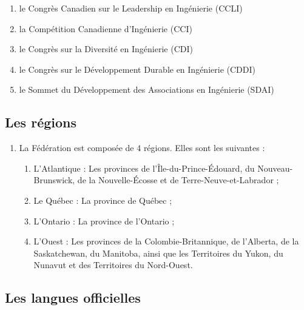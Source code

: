 \begin{enumerate}
\begin{enumerate}
    \begin{enumerate}
     \item
      le Congrès Canadien sur le Leadership en Ingénierie (CCLI)
     \item
      la Compétition Canadienne d'Ingénierie (CCI)
     \item
      le Congrès sur la Diversité en Ingénierie (CDI)
     \item
      le Congrès sur le Développement Durable en Ingénierie (CDDI)
     \item
      le Sommet du Développement des Associations en Ingénierie (SDAI)
    \end{enumerate}
  \end{enumerate}
\end{enumerate}

\subsection{Les régions}
\label{les-regions}

\begin{enumerate}
 \item
  La Fédération est composée de 4 régions. Elles sont les suivantes :

  \begin{enumerate}
   \item
    L'Atlantique : Les provinces de l'Île-du-Prince-Édouard, du Nouveau-Brunswick, de la Nouvelle-Écosse et de Terre-Neuve-et-Labrador ;
   \item
    Le Québec : La province de Québec ;
   \item
    L'Ontario : La province de l'Ontario ;
   \item
    L'Ouest : Les provinces de la Colombie-Britannique, de l'Alberta, de la Saskatchewan, du Manitoba, ainsi que les Territoires du Yukon, du Nunavut et des Territoires du Nord-Ouest.
  \end{enumerate}
\end{enumerate}

\subsection{Les langues officielles}
\label{les-langues-officielles}

